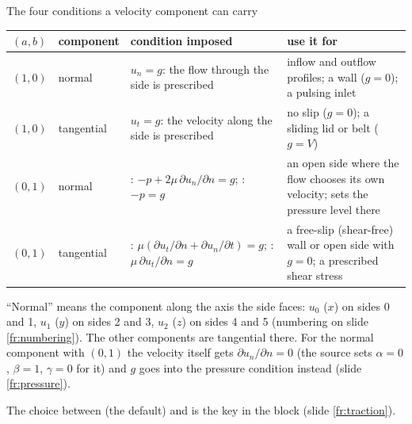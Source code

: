 \documentclass[aspectratio=169,11pt]{beamer}
\begin{document}
\begin{frame}{The four conditions a velocity component can carry}
\label{fr:four}
\scriptsize
\begin{tabular}{@{}L{0.12\textwidth}L{0.1\textwidth}L{0.36\textwidth}L{0.32\textwidth}@{}}
\toprule
$(a,b)$ & component & condition imposed & use it for\\
\midrule
$(1,0)$ & normal & $u_n = g$: the flow through the side is prescribed & inflow and outflow profiles; a wall ($g = 0$); a pulsing inlet\\
$(1,0)$ & tangential & $u_t = g$: the velocity along the side is prescribed & no slip ($g = 0$); a sliding lid or belt ($g = V$)\\
$(0,1)$ & normal & : $-p + 2\mu\,\partial u_n/\partial n = g$; : $-p = g$ & an open side where the flow chooses its own velocity; sets the pressure level there\\
$(0,1)$ & tangential & : $\mu(\partial u_t/\partial n + \partial u_n/\partial t) = g$; : $\mu\,\partial u_t/\partial n = g$ & a free-slip (shear-free) wall or open side with $g = 0$; a prescribed shear stress\\
\bottomrule
\end{tabular}

\vspace{2mm}
\small ``Normal'' means the component along the axis the side faces: $u_0$ ($x$) on sides 0 and 1, $u_1$ ($y$) on sides 2 and 3, $u_2$ ($z$) on sides 4 and 5 (numbering on slide \ref{fr:numbering}). The other components are tangential there. For the normal component with $(0,1)$ the velocity itself gets $\partial u_n/\partial n = 0$ (the source sets $\alpha = 0$, $\beta = 1$, $\gamma = 0$ for it) and $g$ goes into the pressure condition instead (slide \ref{fr:pressure}).
\vspace{1mm}

\small The choice between  (the default) and  is the key  in the  block (slide \ref{fr:traction}).
\end{frame}
\end{document}
